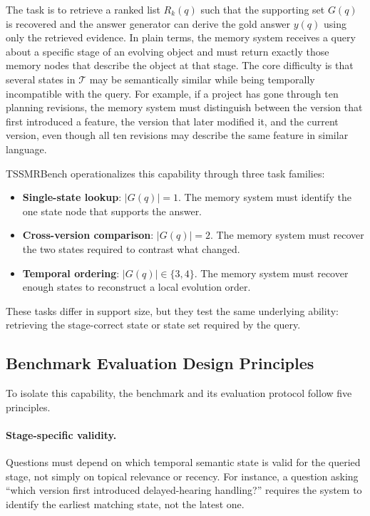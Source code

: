 The task is to retrieve a ranked list $R_k(q)$ such that the supporting set $G(q)$ is recovered and the answer generator can derive the gold answer $y(q)$ using only the retrieved evidence. In plain terms, the memory system receives a query about a specific stage of an evolving object and must return exactly those memory nodes that describe the object at that stage. The core difficulty is that several states in $\mathcal{T}$ may be semantically similar while being temporally incompatible with the query. For example, if a project has gone through ten planning revisions, the memory system must distinguish between the version that first introduced a feature, the version that later modified it, and the current version, even though all ten revisions may describe the same feature in similar language.

TSSMRBench operationalizes this capability through three task families:
\begin{itemize}[leftmargin=*]
\item \textbf{Single-state lookup}: $|G(q)| = 1$. The memory system must identify the one state node that supports the answer.
\item \textbf{Cross-version comparison}: $|G(q)| = 2$. The memory system must recover the two states required to contrast what changed.
\item \textbf{Temporal ordering}: $|G(q)| \in \{3,4\}$. The memory system must recover enough states to reconstruct a local evolution order.
\end{itemize}

These tasks differ in support size, but they test the same underlying ability: retrieving the stage-correct state or state set required by the query.

\subsection{Benchmark Evaluation Design Principles}

To isolate this capability, the benchmark and its evaluation protocol follow five principles.

\paragraph{Stage-specific validity.}
Questions must depend on which temporal semantic state is valid for the queried stage, not simply on topical relevance or recency. For instance, a question asking ``which version first introduced delayed-hearing handling?'' requires the system to identify the earliest matching state, not the latest one.

